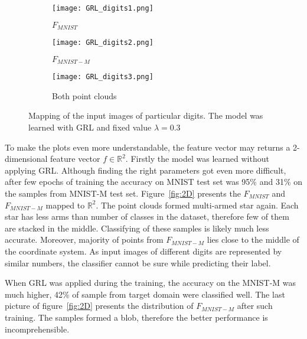 \documentclass{article}
\begin{document}
\begin{figure}%
    \centering
    
    \begin{subfigure}[b]{0.33\textwidth}
        \texttt{[image: GRL\_digits1.png]}
        \caption{$F_{MNIST}$}
    \end{subfigure}%
    \begin{subfigure}[b]{0.33\textwidth}
        \texttt{[image: GRL\_digits2.png]}
        \caption{$F_{MNIST-M}$}
    \end{subfigure}%
    \begin{subfigure}[b]{0.33\textwidth}
        \texttt{[image: GRL\_digits3.png]}
        \caption{Both point clouds}
    \end{subfigure}%

    \caption{Mapping of the input images of particular digits. The model was learned with GRL and fixed value $\lambda = 0.3$}%
    \label{fig:GRL_digits}%
\end{figure}

\par
To make the plots even more understandable, the feature vector may returns a 2-dimensional feature vector $f \in \mathbb{R}^{2}$. Firstly the model was learned without applying GRL. Although finding the right parameters got even more difficult, after few epochs of training the accuracy on MNIST test set was 95\% and 31\% on the samples from MNIST-M test set. Figure~\ref{fig:2D} presents the $F_{MNIST}$ and $F_{MNIST-M}$ mapped to $\mathbb{R}^{2}$. The point clouds formed multi-armed star again. Each star has less arms than number of classes in the dataset, therefore few of them are stacked in the middle. Classifying of these samples is likely much less accurate. Moreover, majority of points from $F_{MNIST-M}$ lies close to the middle of the coordinate system. As input images of different digits are represented by similar numbers, the classifier cannot be sure while predicting their label.
\par
When GRL was applied during the training, the accuracy on the MNIST-M was much higher, 42\% of sample from target domain were classified well. The last picture of figure~\ref{fig:2D} presents the distribution of $F_{MNIST-M}$ after such training. The samples formed a blob, therefore the better performance is incomprehensible. 
\end{document}
